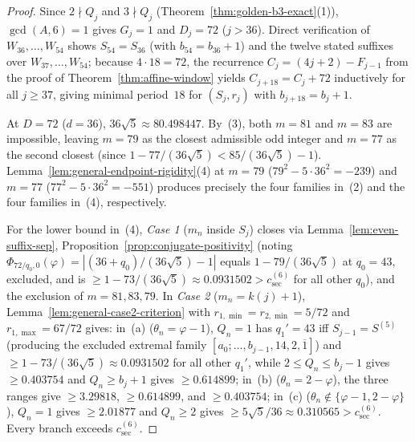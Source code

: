 \documentclass[11pt]{amsart}
\theoremstyle{definition}
\theoremstyle{remark}
\numberwithin{equation}{section}
\begin{document}
\begin{proof}
Since $2\nmid Q_j$ and $3\nmid Q_j$ (Theorem~\ref{thm:golden-b3-exact}(1)),
$\gcd(A,6)=1$ gives $G_j=1$ and $D_j=72$ ($j>36$). Direct verification of
$W_{36},\ldots,W_{54}$ shows $S_{54}=S_{36}$ (with $b_{54}=b_{36}+1$) and
the twelve stated suffixes over $W_{37},\ldots,W_{54}$; because $4\cdot18=72$,
the recurrence $C_j=(4j+2)-F_{j-1}$ from the proof of Theorem~\ref{thm:affine-window}
yields $C_{j+18}=C_j+72$ inductively for all $j\ge37$, giving minimal
period~$18$ for $(S_j,r_j)$ with $b_{j+18}=b_j+1$.

At $D=72$ ($d=36$), $36\sqrt5\approx80.498447$. By~(3), both $m=81$ and $m=83$
are impossible, leaving $m=79$ as the closest admissible odd integer and
$m=77$ as the second closest (since $1-77/(36\sqrt5)<85/(36\sqrt5)-1$).
Lemma~\ref{lem:general-endpoint-rigidity}(4) at $m=79$ ($79^2-5\cdot36^2=-239$)
and $m=77$ ($77^2-5\cdot36^2=-551$) produces precisely the four families in~(2)
and the four families in~(4), respectively.

For the lower bound in~(4), \emph{Case 1} ($m_n$ inside $S_j$) closes via
Lemma~\ref{lem:even-suffix-sep}, Proposition~\ref{prop:conjugate-positivity}
(noting $\Phi_{72/q_0,0}(\varphi)=|(36+q_0)/(36\sqrt5)-1|$ equals $1-79/(36\sqrt5)$
at $q_0=43$, excluded, and is $\ge1-73/(36\sqrt5)\approx0.0931502>c_{\mathrm{sec}}^{(6)}$
for all other $q_0$), and the exclusion of $m=81,83,79$.
In \emph{Case 2} ($m_n=k(j)+1$), Lemma~\ref{lem:general-case2-criterion} with
$r_{1,\min}=r_{2,\min}=5/72$ and $r_{1,\max}=67/72$ gives:
in~(a) ($\theta_n=\varphi-1$), $Q_n=1$ has $q_1'=43$ iff $S_{j-1}=S^{(5)}$
(producing the excluded extremal family $[a_0;\ldots,b_{j-1},14,2,\overline1]$)
and $\ge1-73/(36\sqrt5)\approx0.0931502$ for all other $q_1'$, while
$2\le Q_n\le b_j-1$ gives $\ge0.403754$ and $Q_n\ge b_j+1$ gives $\ge0.614899$;
in~(b) ($\theta_n=2-\varphi$), the three ranges give $\ge3.29818$, $\ge0.614899$,
and $\ge0.403754$; in~(c) ($\theta_n\notin\{\varphi-1,2-\varphi\}$), $Q_n=1$
gives $\ge2.01877$ and $Q_n\ge2$ gives $\ge5\sqrt5/36\approx0.310565>c_{\mathrm{sec}}^{(6)}$.
Every branch exceeds $c_{\mathrm{sec}}^{(6)}$.
\end{proof}
\end{document}
